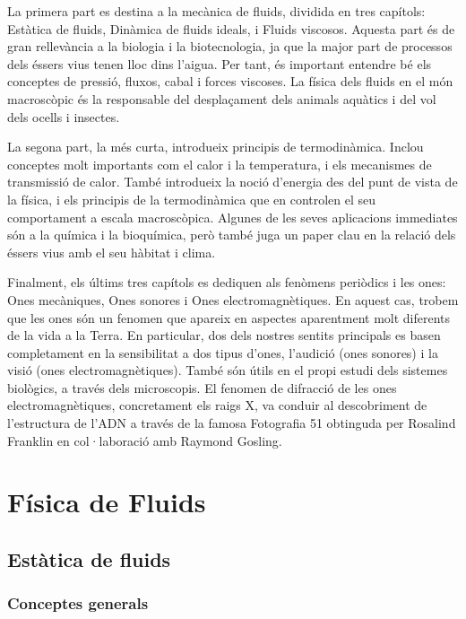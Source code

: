 \documentclass[12pt]{book}
\begin{document}
\newpage

La primera part es destina a la mecànica de fluids, dividida en tres capítols: Estàtica de fluids, Dinàmica de fluids ideals, i Fluids viscosos. Aquesta part és de gran rellevància a la biologia i la biotecnologia, ja que la major part de processos dels éssers vius tenen lloc dins l'aigua. Per tant, és important entendre bé els conceptes de pressió, fluxos, cabal i forces viscoses. La física dels fluids en el món macroscòpic és la responsable del desplaçament dels animals aquàtics i del vol dels ocells i insectes.

La segona part, la més curta, introdueix principis de termodinàmica. Inclou conceptes molt importants com el calor i la temperatura, i els mecanismes de transmissió de calor. També introdueix la noció d'energia des del punt de vista de la física, i els principis de la termodinàmica que en controlen el seu comportament a escala macroscòpica. Algunes de les seves aplicacions immediates són a la química i la bioquímica, però també juga un paper clau en la relació dels éssers vius amb el seu hàbitat i clima.

Finalment, els últims tres capítols es dediquen als fenòmens periòdics i les ones: Ones mecàniques, Ones sonores i Ones electromagnètiques. En aquest cas, trobem que les ones són un fenomen que apareix en aspectes aparentment molt diferents de la vida a la Terra. En particular, dos dels nostres sentits principals es basen completament en la sensibilitat a dos tipus d'ones, l'audició (ones sonores) i la visió (ones electromagnètiques). També són útils en el propi estudi dels sistemes biològics, a través dels microscopis. El fenomen de difracció de les ones electromagnètiques, concretament els raigs X, va conduir al descobriment de l'estructura de l'ADN a través de la famosa Fotografia 51 obtinguda per Rosalind Franklin en col·laboració amb Raymond Gosling.


\part{Física de Fluids}

\chapter{Estàtica de fluids}
\label{chap:Hidrostatica}

\section{Conceptes generals}
\end{document}
